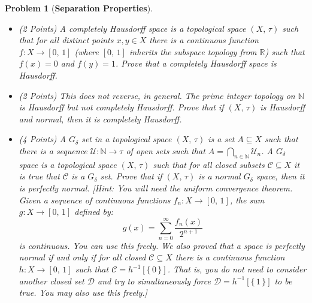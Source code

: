 \documentclass{article}
\theoremstyle{normal}
\newtheorem{problem}{Problem}
\begin{document}
    \clearpage
    \begin{problem}[\textbf{Separation Properties}]
        \par\hfill\par\vspace{2em}
        \begin{itemize}
            \item
            (2 Points)
            A completely Hausdorff space is a topological space $(X,\,\tau)$
            such that for all distinct points $x,y\in{X}$ there is a continuous
            function $f:X\rightarrow[0,\,1]$ (where $[0,\,1]$ inherits the
            subspace topology from $\mathbb{R}$) such that $f(x)=0$ and
            $f(y)=1$. Prove that a completely Hausdorff space is Hausdorff.
            \item
            (2 Points)
            This does not reverse, in general. The prime integer topology on
            $\mathbb{N}$ is Hausdorff but not completely Hausdorff. Prove that
            if $(X,\,\tau)$ is Hausdorff and normal, then it is completely
            Hausdorff.
            \item
            (4 Points)
            A $G_{\delta}$ set in a topological space
            $(X,\,\tau)$ is a set $A\subseteq{X}$ such that there is a sequence
            $\mathcal{U}:\mathbb{N}\rightarrow\tau$ of open sets such that
            $A=\bigcap_{n\in\mathbb{N}}\mathcal{U}_{n}$. A $G_{\delta}$ space
            is a topological space $(X,\,\tau)$ such that for all closed
            subsets $\mathcal{C}\subseteq{X}$ it is true that
            $\mathcal{C}$ is a $G_{\delta}$ set. Prove that if
            $(X,\,\tau)$ is a normal $G_{\delta}$ space, then it is perfectly
            normal. [Hint: You will need the uniform convergence theorem. Given
            a sequence of continuous functions $f_{n}:X\rightarrow[0,\,1]$,
            the sum $g:X\rightarrow[0,\,1]$ defined by:
            \begin{equation}
                g(x)=\sum_{n=0}^{\infty}\frac{f_{n}(x)}{2^{n+1}}
            \end{equation}
            is continuous. You can use this freely. We also proved that a space
            is perfectly normal if and only if for all closed
            $\mathcal{C}\subseteq{X}$ there is a continuous function
            $h:X\rightarrow[0,\,1]$ such that $\mathcal{C}=h^{-1}[\{\,0\,\}]$.
            That is, you do not need to consider another closed set
            $\mathcal{D}$ and try to simultaneously force
            $\mathcal{D}=h^{-1}[\{\,1\,\}]$ to be true.
            You may also use this freely.]
        \end{itemize}
    \end{problem}
\end{document}
